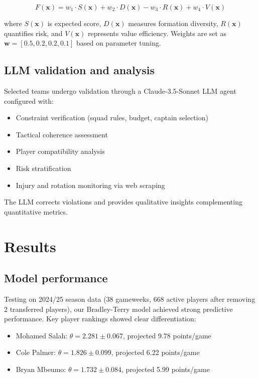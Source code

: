 \documentclass[10pt,a4paper]{article}
\begin{document}
\begin{equation}
F(\mathbf{x}) = w_1 \cdot S(\mathbf{x}) + w_2 \cdot D(\mathbf{x}) - w_3 \cdot R(\mathbf{x}) + w_4 \cdot V(\mathbf{x})
\end{equation}

where $S(\mathbf{x})$ is expected score, $D(\mathbf{x})$ measures formation diversity, $R(\mathbf{x})$ quantifies risk, and $V(\mathbf{x})$ represents value efficiency. Weights are set as $\mathbf{w} = [0.5, 0.2, 0.2, 0.1]$ based on parameter tuning.

\subsection*{LLM validation and analysis}

Selected teams undergo validation through a Claude-3.5-Sonnet LLM agent configured with:

\begin{itemize}
\item Constraint verification (squad rules, budget, captain selection)
\item Tactical coherence assessment
\item Player compatibility analysis
\item Risk stratification
\item Injury and rotation monitoring via web scraping
\end{itemize}

The LLM corrects violations and provides qualitative insights complementing quantitative metrics.

\section*{Results}

\subsection*{Model performance}

Testing on 2024/25 season data (38 gameweeks, 668 active players after removing 2 transferred players), our Bradley-Terry model achieved strong predictive performance. Key player rankings showed clear differentiation:

\begin{itemize}
\item Mohamed Salah: $\theta = 2.281 \pm 0.067$, projected 9.78 points/game
\item Cole Palmer: $\theta = 1.826 \pm 0.099$, projected 6.22 points/game  
\item Bryan Mbeumo: $\theta = 1.732 \pm 0.084$, projected 5.99 points/game
\end{itemize}
\end{document}
